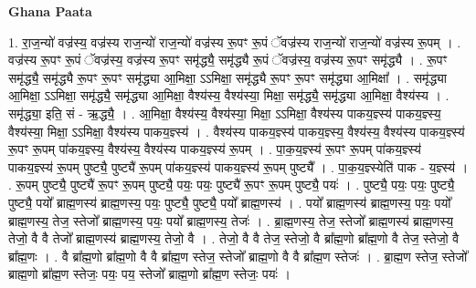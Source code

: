 \documentclass[17pt]{extarticle}
\begin{document}
\textbf{Ghana Paata } \newline

1. रा॒ज॒न्यो॑ वज्र॑स्य॒ वज्र॑स्य राज॒न्यो॑ राज॒न्यो॑ वज्र॑स्य रू॒पꣳ रू॒पं ॅवज्र॑स्य राज॒न्यो॑ राज॒न्यो॑ वज्र॑स्य रू॒पम् । . वज्र॑स्य रू॒पꣳ रू॒पं ॅवज्र॑स्य॒ वज्र॑स्य रू॒पꣳ समृ॑द्ध्यै॒ समृ॑द्ध्यै रू॒पं ॅवज्र॑स्य॒ वज्र॑स्य रू॒पꣳ समृ॑द्ध्यै । . रू॒पꣳ समृ॑द्ध्यै॒ समृ॑द्ध्यै रू॒पꣳ रू॒पꣳ समृ॑द्ध्या आ॒मिक्षा॒ ऽऽमिक्षा॒ समृ॑द्ध्यै रू॒पꣳ रू॒पꣳ समृ॑द्ध्या आ॒मिक्षा᳚ । . समृ॑द्ध्या आ॒मिक्षा॒ ऽऽमिक्षा॒ समृ॑द्ध्यै॒ समृ॑द्ध्या आ॒मिक्षा॒ वैश्य॑स्य॒ वैश्य॑स्या॒ मिक्षा॒ समृ॑द्ध्यै॒ समृ॑द्ध्या आ॒मिक्षा॒ वैश्य॑स्य । . समृ॑द्ध्या॒ इति॒ सं - ऋ॒द्ध्यै॒ । . आ॒मिक्षा॒ वैश्य॑स्य॒ वैश्य॑स्या॒ मिक्षा॒ ऽऽमिक्षा॒ वैश्य॑स्य पाकय॒ज्ञ्स्य॑ पाकय॒ज्ञ्स्य॒ वैश्य॑स्या॒ मिक्षा॒ ऽऽमिक्षा॒ वैश्य॑स्य पाकय॒ज्ञ्स्य॑ । . वैश्य॑स्य पाकय॒ज्ञ्स्य॑ पाकय॒ज्ञ्स्य॒ वैश्य॑स्य॒ वैश्य॑स्य पाकय॒ज्ञ्स्य॑ रू॒पꣳ रू॒पम् पा॑कय॒ज्ञ्स्य॒ वैश्य॑स्य॒ वैश्य॑स्य पाकय॒ज्ञ्स्य॑ रू॒पम् । . पा॒क॒य॒ज्ञ्स्य॑ रू॒पꣳ रू॒पम् पा॑कय॒ज्ञ्स्य॑ पाकय॒ज्ञ्स्य॑ रू॒पम् पुष्ट्यै॒ पुष्ट्यै॑ रू॒पम् पा॑कय॒ज्ञ्स्य॑ पाकय॒ज्ञ्स्य॑ रू॒पम् पुष्ट्यै᳚ । . पा॒क॒य॒ज्ञ्स्येति॑ पाक - य॒ज्ञ्स्य॑ । . रू॒पम् पुष्ट्यै॒ पुष्ट्यै॑ रू॒पꣳ रू॒पम् पुष्ट्यै॒ पयः॒ पयः॒ पुष्ट्यै॑ रू॒पꣳ रू॒पम् पुष्ट्यै॒ पयः॑ । . पुष्ट्यै॒ पयः॒ पयः॒ पुष्ट्यै॒ पुष्ट्यै॒ पयो᳚ ब्राह्म॒णस्य॑ ब्राह्म॒णस्य॒ पयः॒ पुष्ट्यै॒ पुष्ट्यै॒ पयो᳚ ब्राह्म॒णस्य॑ । . पयो᳚ ब्राह्म॒णस्य॑ ब्राह्म॒णस्य॒ पयः॒ पयो᳚ ब्राह्म॒णस्य॒ तेज॒ स्तेजो᳚ ब्राह्म॒णस्य॒ पयः॒ पयो᳚ ब्राह्म॒णस्य॒ तेजः॑ । . ब्रा॒ह्म॒णस्य॒ तेज॒ स्तेजो᳚ ब्राह्म॒णस्य॑ ब्राह्म॒णस्य॒ तेजो॒ वै वै तेजो᳚ ब्राह्म॒णस्य॑ ब्राह्म॒णस्य॒ तेजो॒ वै । . तेजो॒ वै वै तेज॒ स्तेजो॒ वै ब्रा᳚ह्म॒णो ब्रा᳚ह्म॒णो वै तेज॒ स्तेजो॒ वै ब्रा᳚ह्म॒णः । . वै ब्रा᳚ह्म॒णो ब्रा᳚ह्म॒णो वै वै ब्रा᳚ह्म॒ण स्तेज॒ स्तेजो᳚ ब्राह्म॒णो वै वै ब्रा᳚ह्म॒ण स्तेजः॑ । . ब्रा॒ह्म॒ण स्तेज॒ स्तेजो᳚ ब्राह्म॒णो ब्रा᳚ह्म॒ण स्तेजः॒ पयः॒ पय॒ स्तेजो᳚ ब्राह्म॒णो ब्रा᳚ह्म॒ण स्तेजः॒ पयः॑ । \newline
\end{document}

